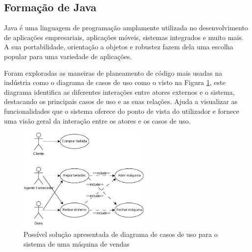     \subsection{Formação de Java}\label{subsec:java}

      Java é uma linguagem de programação amplamente utilizada no desenvolvimento de aplicações empresariais, aplicações móveis, sistemas integrados e muito mais. A sua portabilidade, orientação a objetos e robustez fazem dela uma escolha popular para uma variedade de aplicações.

      Foram exploradas as maneiras de planeamento de código mais usadas na indústria como o diagrama de casos de uso como o visto na Figura \ref{fig:vending_machine}, este diagrama identifica as diferentes interações entre atores externos e o sistema, destacando os principais casos de uso e as suas relações. Ajuda a visualizar as funcionalidades que o sistema oferece do ponto de vista do utilizador e fornece uma visão geral da interação entre os atores e os casos de uso.
      
      \begin{figure}[H]
          \centering
          \includegraphics[width=0.58\textwidth]{imgs/UseCaseDiagramVendingMachine3.drawio.pdf}
          \caption{Possível solução apresentada de diagrama de casos de uso para o sistema de uma máquina de vendas}\label{fig:vending_machine}
      \end{figure}

